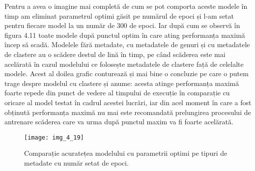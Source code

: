 Pentru a avea o imagine mai completă de cum se pot comporta aceste modele în timp am eliminat parametrul optimi găsit pe numărul de epoci și l-am setat pentru fiecare model la un număr de 300 de epoci. Iar după cum se observă în figura 4.11 toate modele după punctul optim în care ating performanța maximă încep să scadă. Modelele fără metadate, cu metadatele de genuri și cu metadatele de clastere au o scădere destul de lină în timp, pe când scăderea este mai acelărată în cazul modelului ce folosește metadatele de clastere față de celelalte modele. 
Acest al doilea grafic conturează și mai bine o concluzie pe care o putem trage despre modelul cu clastere și anume: acesta atinge performanța maximă foarte repede din punct de vedere al timpului de execuție în comparație cu oricare al model testat în cadrul acestei lucrări, iar din acel moment în care a fost obținută performanța maximă nu mai este recomandată prelungirea procesului de antrenare scăderea care va urma după punctul maxim va fi foarte acelărată.
\begin{figure}[!h]
	\centering
	\texttt{[image: img\_4\_19]}
	\caption[Comparație acuratețea modelului cu parametrii optimi pe tipuri de metadate cu număr setat de epoci]{Comparație acuratețea modelului cu parametrii optimi pe tipuri de metadate cu număr setat de epoci.}
\end{figure}